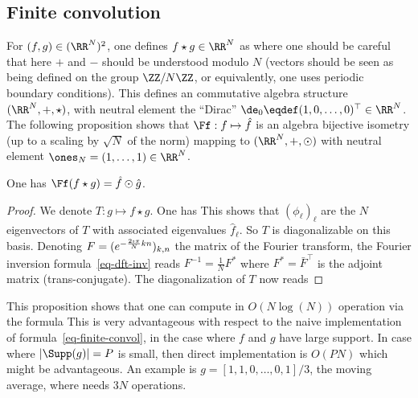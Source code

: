 \subsection{Finite convolution}

For $(f,g) \in (\RR^{N})^2$, one defines $f\star g \in \RR^N$ as
where one should be careful that here $+$ and $-$ should be understood modulo $N$ (vectors should be seen as being defined on the group $\ZZ/N\ZZ$, or equivalently, one uses periodic boundary conditions).
%
This defines an commutative algebra structure $(\RR^N,+,\star)$, with neutral element the ``Dirac'' $\de_0 \eqdef (1,0,\ldots,0)^\top \in \RR^N$. The following proposition shows that $\Ff : f \mapsto \hat f$ is an algebra bijective isometry (up to a scaling by $\sqrt{N}$ of the norm) mapping to $(\RR^N,+,\odot)$ with neutral element $\ones_N=(1,\ldots,1) \in \RR^N$.

\begin{prop}\label{prop-tfd-conv}
	One has $\Ff( f \star g ) = \hat f \odot \hat g$. 
\end{prop}
\begin{proof}
	We denote $T : g \mapsto f \star g$. One has 
	This shows that $(\phi_\ell)_\ell$ are the $N$ eigenvectors of $T$ with associated eigenvalues $\hat f_\ell$. So $T$ is diagonalizable on this basis. Denoting $F=(  e^{ -\frac{2\imath\pi}{N} k n } )_{k,n}$ the matrix of the Fourier transform, the Fourier inversion formula~\eqref{eq-dft-inv} reads $F^{-1} = \frac{1}{N}F^*$ where $F^*=\bar F^\top$ is the adjoint matrix (trans-conjugate). The diagonalization of $T$ now reads
\end{proof}

This proposition shows that one can compute in $O(N\log(N))$ operation via the formula
This is very advantageous with respect to the naive implementation of formula~\eqref{eq-finite-convol}, in the case where $f$ and $g$ have large support. In case where $|\Supp(g)|=P$ is small, then direct implementation is $O(PN)$ which might be advantageous. An example is $g=[1,1,0,\ldots,0,1]/3$, the moving average, where
needs $3N$ operations.


